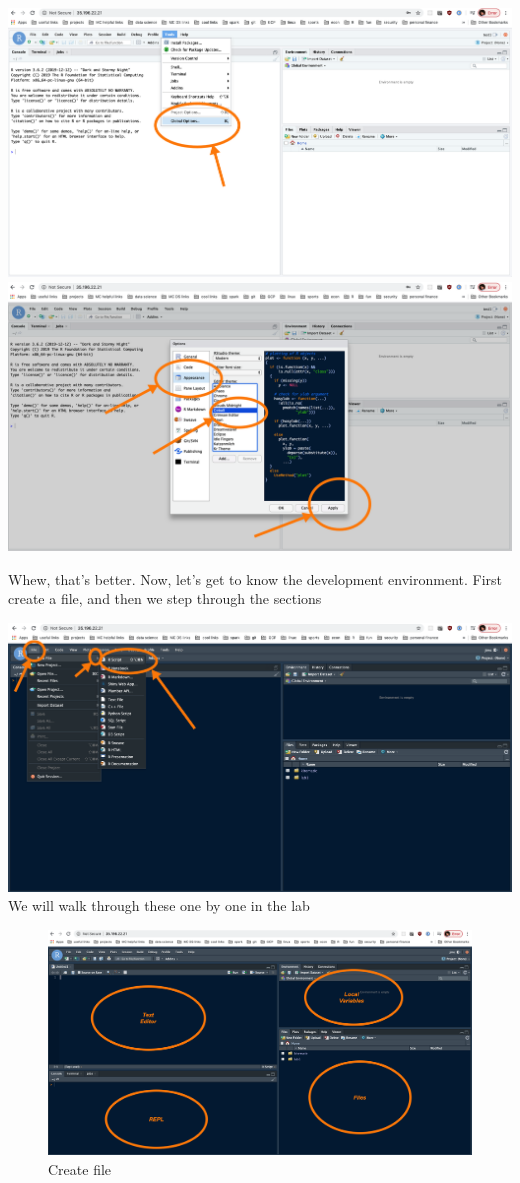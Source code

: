 \documentclass[]{book}
\begin{document}
\includegraphics{./pics/lab1_ss2.png}
\includegraphics{./pics/lab1_ss3.png}

Whew, that's better. Now, let's get to know the development environment. First create a file, and then we step through the sections

\includegraphics{./pics/lab1_ss4.png}
We will walk through these one by one in the lab

\begin{figure}
\centering
\includegraphics{./pics/lab1_ss5.png}
\caption{Create file}
\end{figure}
\end{document}
